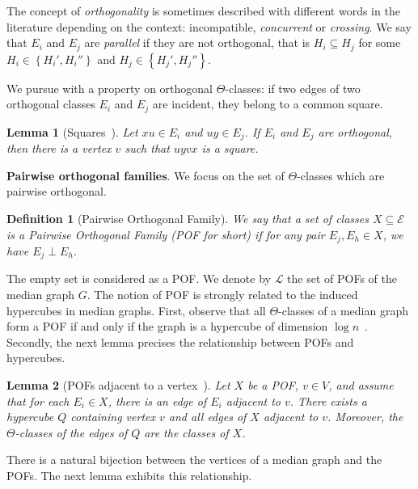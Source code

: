 \documentclass[11pt,letterpaper]{article}
\newtheorem{lemma}{Lemma}
\newtheorem{definition}{Definition}
\newcommand{\set}[1]{\left\{ #1 \right\}}
\begin{document}
The concept of \textit{orthogonality} is sometimes described with different words in the literature depending on the context: incompatible, \textit{concurrent} or \textit{crossing}. We say that $E_i$ and $E_j$ are \textit{parallel} if they are not orthogonal, that is $H_i \subseteq H_j$ for some $H_i \in \set{H_i',H_i''}$ and $H_j \in \set{H_j',H_j''}$. 

We pursue with a property on orthogonal $\Theta$-classes: if two edges of two orthogonal classes $E_i$ and $E_j$ are incident, they belong to a common square.

\begin{lemma}[Squares~\cite{BaCo93,BeHa21}]
Let $xu \in E_i$ and $uy \in E_j$. If $E_i$ and $E_j$ are orthogonal, then there is a vertex $v$ such that $uyvx$ is a square.
\label{le:squares}
\end{lemma}

\textbf{Pairwise orthogonal families}. We focus on the set of $\Theta$-classes which are pairwise orthogonal.

\begin{definition}[Pairwise Orthogonal Family]
We say that a set of classes $X \subseteq \mathcal{E}$ is a {\em Pairwise Orthogonal Family (POF for short)} if for any pair $E_j,E_h \in X$, we have $E_j \perp E_h$.
\end{definition}

The empty set is considered as a POF. We denote by $\mathcal{L}$ the set of POFs of the median graph $G$. The notion of POF is strongly related to the induced hypercubes in median graphs. First, observe that all $\Theta$-classes of a median graph form a POF if and only if the graph is a hypercube of dimension $\log n$~\cite{Ko09,MoMuRo98}. Secondly, the next lemma precises the relationship  between POFs and hypercubes.


\begin{lemma}[POFs adjacent to a vertex~\cite{BeHa21}]
Let $X$ be a POF, $v \in V$, and assume that for each $E_i \in X$, there is an edge of $E_i$ adjacent to $v$. There exists a hypercube $Q$ containing vertex $v$ and all edges of $X$ adjacent to $v$. Moreover, the $\Theta$-classes of the edges of $Q$ are the classes of $X$.
\label{le:pof_adjacent}
\end{lemma}

There is a natural bijection between the vertices of a median graph and the POFs. The next lemma exhibits this relationship.
\end{document}
